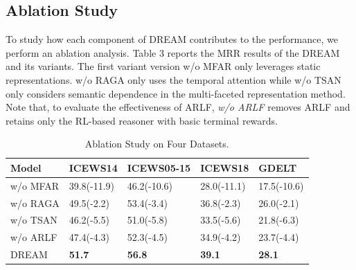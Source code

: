 \documentclass[sigconf,natbib=true]{acmart}
\begin{document}
 

\subsection{Ablation Study}


To study how each component of DREAM contributes to the performance, we perform an ablation analysis. Table 3   reports the MRR results of the DREAM and its variants. The first variant version w/o MFAR only leverages static representations. w/o  RAGA only uses the temporal attention while w/o TSAN only considers semantic dependence in the multi-faceted representation method. Note that, to evaluate the effectiveness of ARLF,  \emph{w/o ARLF} removes ARLF and retains only the RL-based reasoner with basic terminal rewards.  

\begin{table}
\centering
\small
	\caption{Ablation Study on Four Datasets. }
 \vspace{-0.35cm}
	\begin{tabular}{lllll}
		 \hline
		Model     & ICEWS14 & ICEWS05-15 & ICEWS18 &GDELT \\
		\hline
	w/o MFAR & 39.8(-11.9) & 46.2(-10.6) & 28.0(-11.1) &17.5(-10.6)\\
        w/o  RAGA & 49.5(-2.2) & 53.4(-3.4) & 36.8(-2.3) &26.0(-2.1)\\
        w/o TSAN & 46.2(-5.5) & 51.0(-5.8) & 33.5(-5.6) &21.8(-6.3)\\
        w/o ARLF & 47.4(-4.3) & 52.3(-4.5) & 34.9(-4.2) &23.7(-4.4)\\
         \hline
         DREAM   & \textbf{51.7} & \textbf{56.8} &\textbf{39.1} &\textbf{28.1}\\
	 \hline
	\end{tabular}
	\label{tab:plain}
 \vspace{-0.3cm}
\end{table}	
\end{document}
